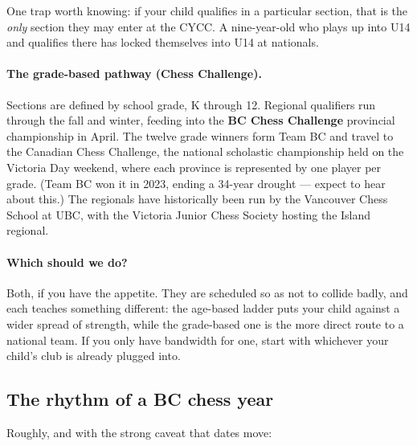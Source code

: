 \documentclass[10pt,letterpaper]{article}
\newcommand{\term}[1]{\textbf{#1}}
\begin{document}
One trap worth knowing: if your child qualifies in a particular section, that
is the \emph{only} section they may enter at the CYCC. A nine-year-old who
plays up into U14 and qualifies there has locked themselves into U14 at
nationals.

\paragraph{The grade-based pathway (Chess Challenge).} Sections are defined by
school grade, K through 12. Regional qualifiers run through the fall and
winter, feeding into the \term{BC Chess Challenge} provincial championship in
April. The twelve grade winners form Team BC and travel to the
Canadian Chess Challenge, the national scholastic championship held on
the Victoria Day weekend, where each province is represented by one player per
grade. (Team BC won it in 2023, ending a 34-year drought --- expect to hear
about this.) The regionals have historically been run by the Vancouver Chess
School at UBC, with the Victoria Junior Chess Society hosting the Island
regional.

\paragraph{Which should we do?} Both, if you have the appetite. They are
scheduled so as not to collide badly, and each teaches something different: the
age-based ladder puts your child against a wider spread of strength, while the
grade-based one is the more direct route to a national team. If you only have
bandwidth for one, start with whichever your child's club is already plugged
into.

\subsection{The rhythm of a BC chess year}

Roughly, and with the strong caveat that dates move:
\end{document}
